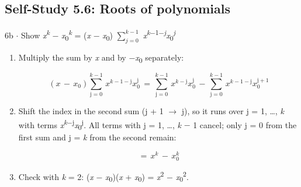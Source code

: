 \documentclass[11pt]{article}
\begin{document}
\begin{keepsection}\subsection{Self-Study 5.6: Roots of polynomials}

\begin{workedbox}{6b \ensuremath{\cdot} Show \textit{x}\textsuperscript{\textit{k}} \ensuremath{-} \textit{x}\textsubscript{0}\textsuperscript{\textit{k}} = (\textit{x} \ensuremath{-} \textit{x}\textsubscript{0}) $\sum_{{j}=0}^{{k}-1} $ \textit{x}\textsuperscript{\textit{k}\ensuremath{-}1\ensuremath{-}\textit{j}}\textit{x}\textsubscript{0}\textsuperscript{\textit{j}}}
\begin{enumerate}
\item {}
Multiply the sum by \textit{x} and by \ensuremath{-}\textit{x}\textsubscript{0} separately:

\begin{equation*}({x}\, -\, {x}_{0})\sum_{\mathrm{j}=0}^{{k}-1} \, {x}^{{k}-1-\mathrm{j}}{x}_{0}^{\mathrm{j}}\, =\, \sum_{\mathrm{j}=0}^{{k}-1} \, {x}^{{k}-\mathrm{j}}{x}_{0}^{\mathrm{j}}\, -\, \sum_{\mathrm{j}=0}^{{k}-1} \, {x}^{{k}-1-\mathrm{j}}{x}_{0}^{\mathrm{j}+1}\end{equation*}
\item {}
Shift the index in the second sum (j + 1 \ensuremath{\to} j), so it runs over j = 1, …, \textit{k} with terms \textit{x}\textsuperscript{\textit{k}\ensuremath{-}j}\textit{x}\textsubscript{0}\textsuperscript{j}. All terms with j = 1, …, \textit{k} \ensuremath{-} 1 cancel; only j = 0 from the first sum and j = \textit{k} from the second remain:

\begin{equation*}=\, {x}^{{k}}\, -\, {x}_{0}^{{k}}\end{equation*}
\item Check with \textit{k} = 2: (\textit{x} \ensuremath{-} \textit{x}\textsubscript{0})(\textit{x} + \textit{x}\textsubscript{0}) = \textit{x}\textsuperscript{2} \ensuremath{-} \textit{x}\textsubscript{0}\textsuperscript{2}.
\end{enumerate}
\end{workedbox}

\end{keepsection}
\end{document}
